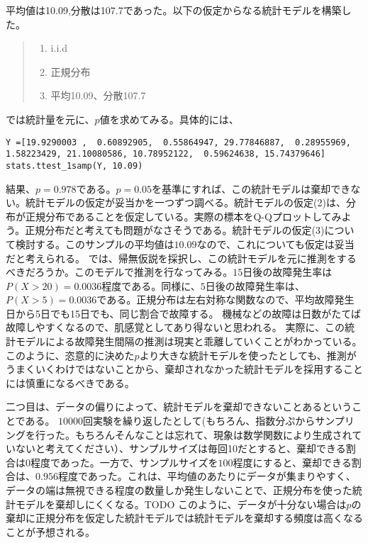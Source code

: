 \documentclass[a4paper,11pt,dvipdfmx]{jsarticle}
\begin{document}
平均値は10.09,分散は107.7であった。以下の仮定からなる統計モデルを構築した。
\begin{quote}
    \begin{enumerate}[(1)]
\item i.i.d
\item 正規分布
\item 平均10.09、分散107.7
\end{enumerate}
\end{quote}
では統計量を元に、$p$値を求めてみる。具体的には、

\begin{lstlisting}
Y =[19.9290003 ,  0.60892905,  0.55864947, 29.77846887,  0.28955969,  1.58223429, 21.10080586, 10.78952122,  0.59624638, 15.74379646]
stats.ttest_1samp(Y, 10.09)
\end{lstlisting}

結果、$p=0.978$である。$p=0.05$を基準にすれば、この統計モデルは棄却できない。統計モデルの仮定が妥当かを一つずつ調べる。統計モデルの仮定(2)は、分布が正規分布であることを仮定している。実際の標本をQ-Qプロットしてみよう。正規分布だと考えても問題がなさそうである。統計モデルの仮定(3)について検討する。このサンプルの平均値は$10.09$なので、これについても仮定は妥当だと考えられる。
では、帰無仮説を採択し、この統計モデルを元に推測をするべきだろうか。このモデルで推測を行なってみる。$15$日後の故障発生率は$P(X>20)=0.0036$程度である。同様に、$5$日後の故障発生率は、$P(X>5)=0.0036$である。正規分布は左右対称な関数なので、平均故障発生日から5日でも15日でも、同じ割合で故障する。 
機械などの故障は日数がたてば故障しやすくなるので、肌感覚としてあり得ないと思われる。
実際に、この統計モデルによる故障発生間隔の推測は現実と乖離していくことがわかっている。
このように、恣意的に決めた$p$より大きな統計モデルを使ったとしても、推測がうまくいくわけではないことから、棄却されなかった統計モデルを採用することには慎重になるべきである。

二つ目は、データの偏りによって、統計モデルを棄却できないことあるということである。
$10000$回実験を繰り返したとして(もちろん、指数分ぷからサンプリングを行った。もちろんそんなことは忘れて、現象は数学関数により生成されていないと考えてください）、サンプルサイズは毎回10だとすると、棄却できる割合は0程度であった。一方で、サンプルサイズを$100$程度にすると、棄却できる割合は、$0.956$程度であった。これは、平均値のあたりにデータが集まりやすく、データの端は無視できる程度の数量しか発生しないことで、正規分布を使った統計モデルを棄却しにくくなる。TODO
このように、データが十分ない場合は$p$の棄却に正規分布を仮定した統計モデルでは統計モデルを棄却する頻度は高くなることが予想される。
\end{document}
